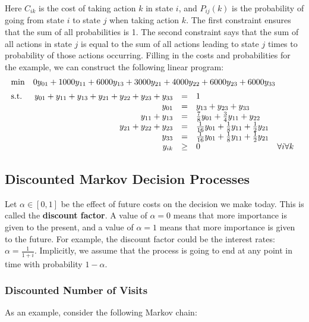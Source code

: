 \documentclass[12pt]{article}
\begin{document}
\noindent
Here $C_{ik}$ is the cost of taking action $k$ in state $i$, and $P_{ij}(k)$ is the probability of going from state $i$ to state $j$ when taking action $k$.
The first constraint ensures that the sum of all probabilities is 1.
The second constraint says that the sum of all actions in state $j$ is equal to the sum of all actions leading to state $j$ times to probability of those actions occurring.
Filling in the costs and probabilities for the example, we can construct the following linear program:
\begin{align*}
    &\mathrm{min} \quad 0y_{01} + 1000y_{11} + 6000y_{13} + 3000y_{21} + 4000y_{22} + 6000y_{23} + 6000y_{33} \\[2pt]
    &\mathrm{s.t.} \quad 
    \begin{array}[t]{r c l l}
        y_{01} + y_{11} + y_{13} + y_{21} + y_{22} + y_{23} + y_{33} & = & 1 & \\
        y_{01} & = & y_{13} + y_{23} + y_{33} & \\
        y_{11} + y_{13} & = & \frac{7}{8}y_{01} + \frac{3}{4}y_{11} + y_{22} & \\
        y_{21} + y_{22} + y_{23} & = & \frac{1}{16}y_{01} + \frac{1}{8}y_{11} + \frac{1}{2}y_{21} & \\
        y_{33} & = & \frac{1}{16}y_{01} + \frac{1}{8}y_{11} + \frac{1}{2}y_{21} & \\
        y_{ik} & \geq & 0 & \forall i \forall k
     \end{array}
\end{align*}

\newpage
\subsection{Discounted Markov Decision Processes}
Let $\alpha \in [0, 1]$ be the effect of future costs on the decision we make today.
This is called the \textbf{discount factor}.
A value of $\alpha = 0$ means that more importance is given to the present, and a value of $\alpha = 1$ means that more importance is given to the future.
For example, the discount factor could be the interest rates: $\alpha = \frac{1}{1 + i}$.
Implicitly, we assume that the process is going to end at any point in time with probability $1 - \alpha$.

\subsubsection{Discounted Number of Visits}
As an example, consider the following Markov chain:
\end{document}
